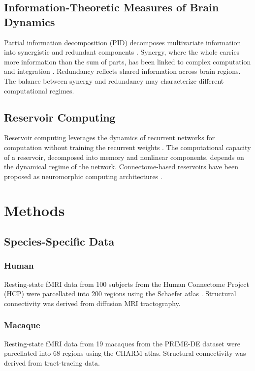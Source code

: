 \documentclass[11pt]{article}
\begin{document}
\subsection{Information-Theoretic Measures of Brain Dynamics}
Partial information decomposition (PID) decomposes multivariate information into synergistic and redundant components \citep{williams2010nonnegative}. Synergy, where the whole carries more information than the sum of parts, has been linked to complex computation and integration \citep{luppi2022synergistic}. Redundancy reflects shared information across brain regions. The balance between synergy and redundancy may characterize different computational regimes.

\subsection{Reservoir Computing}
Reservoir computing leverages the dynamics of recurrent networks for computation without training the recurrent weights \citep{jaeger2004harnessing}. The computational capacity of a reservoir, decomposed into memory and nonlinear components, depends on the dynamical regime of the network. Connectome-based reservoirs have been proposed as neuromorphic computing architectures \citep{suarez2021learning}.

\section{Methods}

\subsection{Species-Specific Data}

\subsubsection{Human}
Resting-state fMRI data from 100 subjects from the Human Connectome Project (HCP) were parcellated into 200 regions using the Schaefer atlas \citep{schaefer2018local}. Structural connectivity was derived from diffusion MRI tractography.

\subsubsection{Macaque}
Resting-state fMRI data from 19 macaques from the PRIME-DE dataset were parcellated into 68 regions using the CHARM atlas. Structural connectivity was derived from tract-tracing data.
\end{document}
